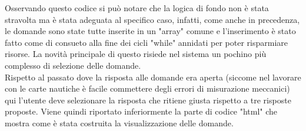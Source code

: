 Osservando questo codice si può notare che la logica di fondo non è stata stravolta ma è stata adeguata al specifico caso, infatti, come anche in precedenza, le domande sono state tutte inserite in un "array" comune e l'inserimento è stato fatto come di consueto alla fine dei cicli "while" annidati per poter risparmiare risorse. La novità principale di questo risiede nel sistema un pochino più complesso di selezione delle domande.\\
Rispetto al passato dove la risposta alle domande era aperta (siccome nel lavorare con le carte nautiche è facile commettere degli errori di misurazione meccanici) qui l'utente deve selezionare la risposta che ritiene giusta rispetto a tre risposte proposte. Viene quindi riportato inferiormente la parte di codice "html" che mostra come è stata costruita la visualizzazione delle domande.\\

